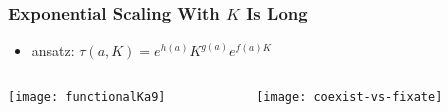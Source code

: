 \documentclass[dvipsnames]{beamer}
\begin{document}


\begin{frame}
\frametitle{Exponential Scaling With $K$ Is Long}
\begin{itemize}
	\item ansatz: $\tau(a,K) = e^{h(a)}K^{g(a)}e^{f(a)K}$
\end{itemize}
\begin{columns}
	\begin{column}{6cm}
		\begin{center}
			\texttt{[image: functionalKa9]}
		\end{center}
	\end{column}
	\begin{column}{5cm}
		\begin{center}
			\texttt{[image: coexist-vs-fixate]}
		\end{center}
	\end{column}
\end{columns}
\end{frame}
\end{document}
